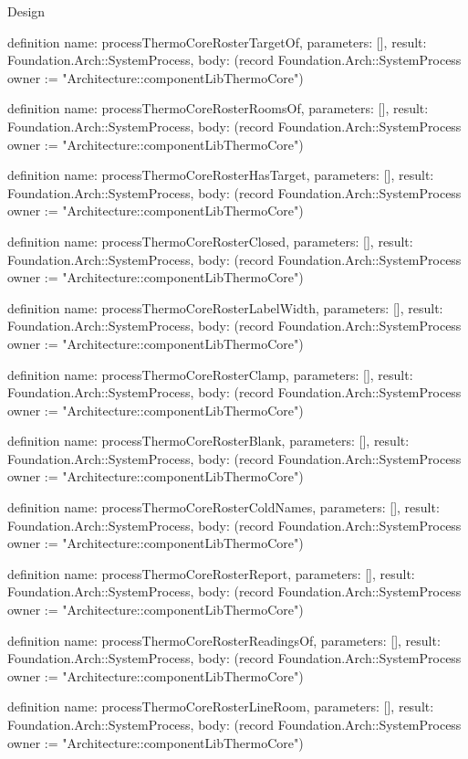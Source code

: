 \begin{lexlean}{Design}
\begin{semanticmodule}
definition{
  name: processThermoCoreRosterTargetOf,
  parameters: [],
  result: Foundation.Arch::SystemProcess,
  body: (record Foundation.Arch::SystemProcess {owner := "Architecture::componentLibThermoCore"})
}

definition{
  name: processThermoCoreRosterRoomsOf,
  parameters: [],
  result: Foundation.Arch::SystemProcess,
  body: (record Foundation.Arch::SystemProcess {owner := "Architecture::componentLibThermoCore"})
}

definition{
  name: processThermoCoreRosterHasTarget,
  parameters: [],
  result: Foundation.Arch::SystemProcess,
  body: (record Foundation.Arch::SystemProcess {owner := "Architecture::componentLibThermoCore"})
}

definition{
  name: processThermoCoreRosterClosed,
  parameters: [],
  result: Foundation.Arch::SystemProcess,
  body: (record Foundation.Arch::SystemProcess {owner := "Architecture::componentLibThermoCore"})
}

definition{
  name: processThermoCoreRosterLabelWidth,
  parameters: [],
  result: Foundation.Arch::SystemProcess,
  body: (record Foundation.Arch::SystemProcess {owner := "Architecture::componentLibThermoCore"})
}

definition{
  name: processThermoCoreRosterClamp,
  parameters: [],
  result: Foundation.Arch::SystemProcess,
  body: (record Foundation.Arch::SystemProcess {owner := "Architecture::componentLibThermoCore"})
}

definition{
  name: processThermoCoreRosterBlank,
  parameters: [],
  result: Foundation.Arch::SystemProcess,
  body: (record Foundation.Arch::SystemProcess {owner := "Architecture::componentLibThermoCore"})
}

definition{
  name: processThermoCoreRosterColdNames,
  parameters: [],
  result: Foundation.Arch::SystemProcess,
  body: (record Foundation.Arch::SystemProcess {owner := "Architecture::componentLibThermoCore"})
}

definition{
  name: processThermoCoreRosterReport,
  parameters: [],
  result: Foundation.Arch::SystemProcess,
  body: (record Foundation.Arch::SystemProcess {owner := "Architecture::componentLibThermoCore"})
}

definition{
  name: processThermoCoreRosterReadingsOf,
  parameters: [],
  result: Foundation.Arch::SystemProcess,
  body: (record Foundation.Arch::SystemProcess {owner := "Architecture::componentLibThermoCore"})
}

definition{
  name: processThermoCoreRosterLineRoom,
  parameters: [],
  result: Foundation.Arch::SystemProcess,
  body: (record Foundation.Arch::SystemProcess {owner := "Architecture::componentLibThermoCore"})
}


\end{semanticmodule}
\end{lexlean}
